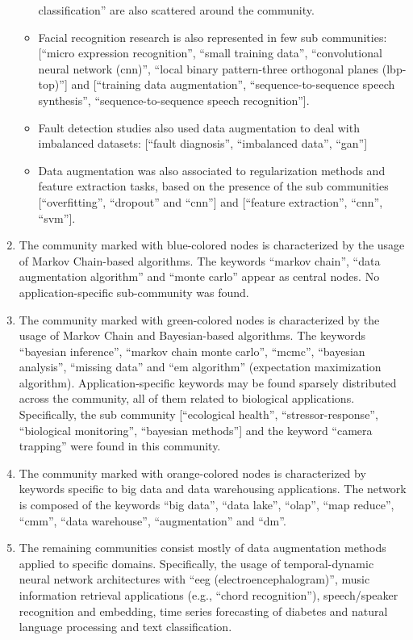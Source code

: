 \documentclass[parskip=full]{scrartcl}
\begin{document}
\begin{enumerate}
\begin{itemize}
                classification'' are also scattered around the community.
            \item Facial recognition research is also represented in few sub
                communities: [``micro expression recognition'', ``small
                training data'', ``convolutional neural network (cnn)'', ``local
                binary pattern-three orthogonal planes (lbp-top)''] and
                [``training data augmentation'', ``sequence-to-sequence speech
                synthesis'', ``sequence-to-sequence speech recognition''].
            \item Fault detection studies also used data augmentation to deal
                with imbalanced datasets: [``fault diagnosis'', ``imbalanced
                data'', ``gan'']
            \item Data augmentation was also associated to regularization
                methods and feature extraction tasks, based on the presence of
                the sub communities [``overfitting'', ``dropout'' and ``cnn'']
                and [``feature extraction'', ``cnn'', ``svm''].
        \end{itemize}
    \item The community marked with blue-colored nodes is characterized by the
        usage of Markov Chain-based algorithms. The keywords ``markov chain'',
        ``data augmentation algorithm'' and ``monte carlo'' appear as central
        nodes. No application-specific sub-community was found.
    \item The community marked with green-colored nodes is characterized by
        the usage of Markov Chain and Bayesian-based algorithms. The keywords
        ``bayesian inference'', ``markov chain monte carlo'', ``mcmc'',
        ``bayesian analysis'', ``missing data'' and ``em algorithm''
        (expectation maximization algorithm). Application-specific keywords
        may be found sparsely distributed across the community, all of them
        related to biological applications. Specifically, the sub community
        [``ecological health'', ``stressor-response'', ``biological
        monitoring'', ``bayesian methods''] and the keyword ``camera
        trapping'' were found in this community. 
    \item The community marked with orange-colored nodes is characterized by
        keywords specific to big data and data warehousing applications. The
        network is composed of the keywords ``big data'', ``data lake'',
        ``olap'', ``map reduce'', ``cmm'', ``data warehouse'',
        ``augmentation'' and ``dm''.
    \item The remaining communities consist mostly of data augmentation
        methods applied to specific domains. Specifically, the usage of
        temporal-dynamic neural network architectures with ``eeg
        (electroencephalogram)'', music information retrieval applications
        (e.g., ``chord recognition''), speech/speaker recognition and
        embedding, time series forecasting of diabetes and natural language
        processing and text classification.
\end{enumerate}
\end{document}

